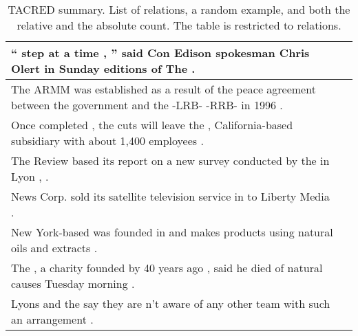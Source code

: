\begin{longtable}{p{} P{1,4cm} }

\caption{TACRED summary. List of relations, a random example, and both the relative and the absolute count. The table is restricted to  relations.}\\

\hline
\hline
{} {`` \underline{} step at a time , '' said Con Edison spokesman Chris Olert in Sunday editions of The \underline{} .} &    \\ 
\hline
{} {The ARMM was established as a result of the peace agreement between the government and the \underline{} -LRB- \underline{} -RRB- in 1996 .} &    \\ 
\hline
{} {Once completed , the cuts will leave the \underline{} , California-based \underline{} subsidiary with about 1,400 employees .} &    \\ 
\hline
{} {The Review based its report on a new survey conducted by the \underline{} in Lyon , \underline{} .} &    \\ 
\hline
{} {News Corp. sold its satellite television service \underline{} in \underline{} to Liberty Media .} &    \\ 
\hline
{} {New York-based \underline{} was founded in \underline{} and makes products using natural oils and extracts .} &    \\ 
\hline
{} {The \underline{} , a charity founded by \underline{} 40 years ago , said he died of natural causes Tuesday morning .} &    \\ 
\hline
{} {Lyons and the \underline{} say they are n't aware of any other \underline{} team with such an arrangement .} &    \\ 

\end{longtable}
